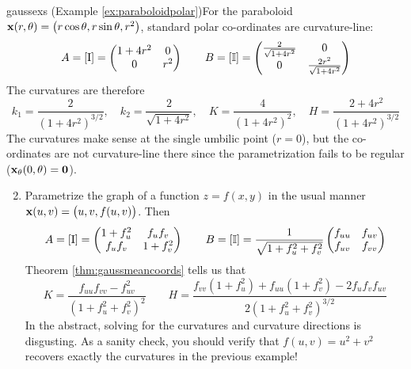 \begin{examples}{}{gaussexs}
	\exstart (Example \ref{ex:paraboloidpolar})\lstsp For the paraboloid ${\mathbf{x}}(r,\theta)=\bigl(r\cos\theta,r\sin\theta,r^2\bigr)$, standard polar co-ordinates are curvature-line:
	  \[
	  	A=[\mathrm{I}]=
	  	\begin{pmatrix}
	  		1+4r^2&0\\0&r^2
	  	\end{pmatrix}
	  	\qquad
	  	B=[\mathbb{I}]=
	  	\begin{pmatrix}
	  		\frac 2{\sqrt{1+4r^2}}&0\\
	  		0&\frac{2r^2}{\sqrt{1+4r^2}}
	  	\end{pmatrix}
	  \]
	  The curvatures are therefore
	  \[
	  	k_1=\frac 2{(1+4r^2)^{3/2}}, \quad k_2=\frac 2{\sqrt{1+4r^2}}, \quad K=\frac 4{(1+4r^2)^2}, \quad H=\frac{2+4r^2}{(1+4r^2)^{3/2}}
	  \]
	  The curvatures make sense at the single umbilic point ($r=0$), but the co-ordinates are not curvature-line there since the parametrization fails to be regular (${\mathbf{x}}_\theta(0,\theta)=\mathbf{0}$).
	  
	\goodbreak
	
	\begin{enumerate}\setcounter{enumi}{1}
	  \item\label{ex:gaussgraph} Parametrize the graph of a function $z=f(x,y)$ in the usual manner ${\mathbf{x}}(u,v)=\bigl(u,v,f(u,v)\bigr)$. Then
	  \[
	  	A=[\mathrm{I}]=
	  	\begin{pmatrix}
	  		1+f_u^2&f_uf_v\\
	  		f_uf_v&1+f_v^2
	  	\end{pmatrix}
	  	\qquad
	  	B=[\mathbb{I}]=\frac 1{\sqrt{1+f_u^2+f_v^2}}
	  	\begin{pmatrix}
	  		f_{uu}&f_{uv}\\
	  		f_{uv}&f_{vv}
	  	\end{pmatrix}
	  \]
	  Theorem \ref{thm:gaussmeancoords} tells us that
		\[
			K=\frac{f_{uu}f_{vv}-f_{uv}^2}{(1+f_u^2+f_v^2)^2} \qquad H=\frac{f_{vv}(1+f_u^2)+f_{uu}(1+f_v^2)-2f_uf_vf_{uv}}{2(1+f_u^2+f_v^2)^{3/2}}
		\]
		In the abstract, solving for the curvatures and curvature directions is disgusting. As a sanity check, you should verify that $f(u,v)=u^2+v^2$ recovers exactly the curvatures in the previous example!
	  

\end{enumerate}
\end{examples}
